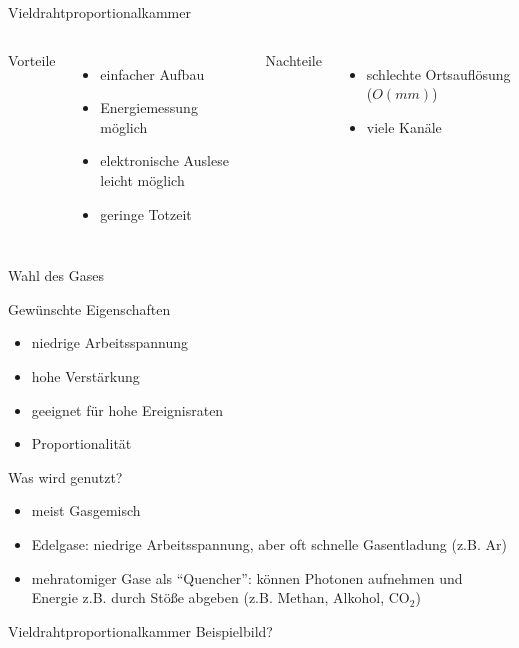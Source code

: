 \begin{frame}{Vieldrahtproportionalkammer}
    \begin{columns}[T]
			Vorteile		
			\begin{itemize}
				\item einfacher Aufbau
			  	\item Energiemessung möglich
			  	\item elektronische Auslese leicht möglich
			  	\item geringe Totzeit 
			\end{itemize}	
	    	Nachteile
	    	\begin{itemize}
			  \item schlechte Ortsauflösung ($O(mm)$)
			  \item viele Kanäle
			\end{itemize}
    \end{columns}
    \vspace{1cm}
\end{frame}

\begin{frame}{Wahl des Gases}
	\begin{block}{Gewünschte Eigenschaften}
		\begin{itemize}
		  \item niedrige Arbeitsspannung
		  \item hohe Verstärkung
		  \item geeignet für hohe Ereignisraten
		  \item Proportionalität
		\end{itemize}
	\end{block}
	\begin{block}{Was wird genutzt?}
		\begin{itemize}
			\item meist Gasgemisch
			\item Edelgase: niedrige Arbeitsspannung, aber oft schnelle Gasentladung (z.B. Ar)
			\item mehratomiger Gase als "`Quencher"': können Photonen aufnehmen und Energie z.B. durch
			Stöße abgeben (z.B. Methan, Alkohol, CO$_2$)
		\end{itemize}
	\end{block}
\end{frame}

\begin{frame}{Vieldrahtproportionalkammer}
    Beispielbild?
\end{frame}
